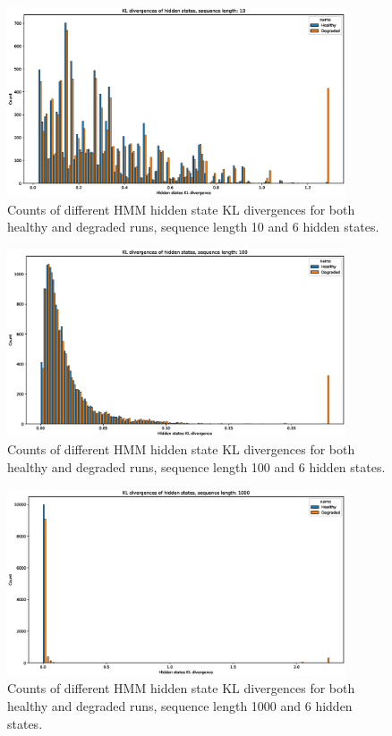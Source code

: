 \documentclass[journal]{IEEEtran}
\begin{document}
\begin{figure}[h]
 \centering
 \includegraphics[width=10cm,keepaspectratio=true]{./kl_histograms_10.eps}
 \caption{Counts of different HMM hidden state KL divergences for both healthy and degraded runs, sequence length 10 and 6 hidden states.}
 \label{figure:kl_10}
\end{figure}

\begin{figure}[h]
 \centering
 \includegraphics[width=10cm,keepaspectratio=true]{./kl_histograms_100.eps}
 \caption{Counts of different HMM hidden state KL divergences for both healthy and degraded runs, sequence length 100 and 6 hidden states.}
 \label{figure:kl_100}
\end{figure}

\begin{figure}[h]
 \centering
 \includegraphics[width=10cm,keepaspectratio=true]{./kl_histograms_1000.eps}
 \caption{Counts of different HMM hidden state KL divergences for both healthy and degraded runs, sequence length 1000 and 6 hidden states.}
 \label{figure:kl_1000}
\end{figure}
\end{document}
